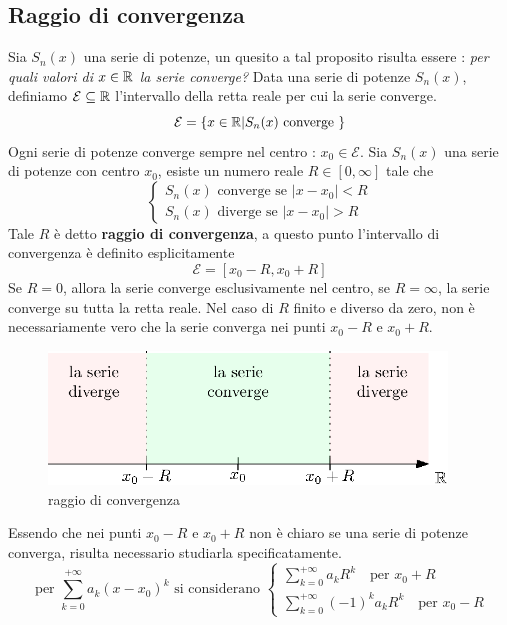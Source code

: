 \documentclass[10pt, letterpaper]{report}
\begin{document}
\subsection{Raggio di convergenza}
Sia $S_n(x)$ una serie di potenze, un quesito a tal proposito risulta essere : \textit{per quali
    valori di $x\in{\mathbb R}$ la serie converge?} Data una serie di
potenze $S_n(x)$, definiamo $\mathcal{E}\subseteq {\mathbb R}$ l'intervallo della retta reale
per cui la serie converge.
$$ \mathcal{E}=\{x\in{\mathbb R} | S_n(x) \text{ converge }\}$$
\prop{} Ogni serie di potenze converge sempre nel centro : $x_0\in\mathcal{E}$.\acc
{} Sia $S_n(x)$ una serie di potenze con centro $x_0$, esiste un numero reale
$R\in[0,\infty]$ tale che $$\begin{cases}
        S_n(x) \text{ converge se }|x-x_0|<R \\
        S_n(x) \text{ diverge se }|x-x_0|>R
    \end{cases}$$
Tale $R$ è detto \textbf{raggio di convergenza}, a questo punto l'intervallo di convergenza è
definito esplicitamente $$\mathcal{E}=[x_0-R,x_0+R]$$
Se $R=0$, allora la serie converge esclusivamente nel centro, se $R=\infty$, la serie converge
su tutta la retta reale. Nel caso di $R$ finito e diverso da zero, non è necessariamente vero
che la serie converga nei punti $x_0-R$ e $x_0+R$.
\begin{figure}[h!]
    \centering
    \includegraphics[width=300pt]{images/raggioConvergenza.eps}
    \caption{raggio di convergenza}
\end{figure}\acc
Essendo che nei punti $x_0-R$ e $x_0+R$ non è chiaro se una serie di potenze converga, risulta
necessario studiarla specificatamente.
$$
    \text{ per }\sum_{k=0}^{+\infty}a_k(x-x_0)^k \text{ si considerano }  \begin{cases}
        \displaystyle \sum_{k=0}^{+\infty}a_kR^k \text{  }\text{ per }x_0+R \\
        \displaystyle \sum_{k=0}^{+\infty}(-1)^ka_kR^k \text{  }\text{ per }x_0-R
    \end{cases}
$$
\end{document}
